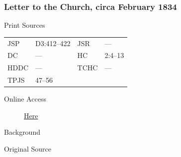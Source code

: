 		\subsubsection{Letter to the Church, circa February 1834}
			\label{EMS-1834-JS-CIR-FEB-1834}
			
			\begin{description}
					\item[Print Sources]
				\end{description}

					\begin{tabular}{p{0.5in}p{1in}p{0.5in}p{1in}}
					JSP	 	& D3:412--422		& JSR 		& --- \\
					DC	 	& --- 				& HC 		& 2:4--13 \\
					HDDC 	& ---				& TCHC 		& --- \\
					TPJS 	& 47--56			& 	 		&  \\
					\end{tabular}
				
				\begin{description}
					\item[Online Access] \href{https://www.josephsmithpapers.org/paper-summary/letter-to-the-church-circa-february-1834/1}{Here}
				\end{description}
				
				\begin{description}
					\item[Background]
				\end{description}
				
				
				\begin{description}
					\item[Original Source]
				\end{description}
				
				
